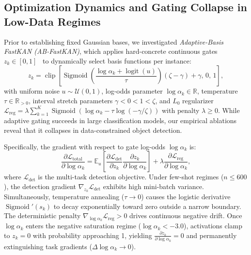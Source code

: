 \documentclass[conference]{IEEEtran}
\begin{document}
\subsection{Optimization Dynamics and Gating Collapse in Low-Data Regimes}
\label{sec:ablation}
Prior to establishing fixed Gaussian bases, we investigated \textit{Adaptive-Basis FastKAN (AB-FastKAN)}, which applies hard-concrete continuous gates $z_k \in [0, 1]$~\cite{louizos2018learning,maddison2017concrete} to dynamically select basis functions per instance:
\begin{equation}
  z_k = \operatorname{clip}\!\left[\operatorname{Sigmoid}\!\left(\frac{\log\alpha_k + \operatorname{logit}(u)}{\tau}\right)(\zeta - \gamma) + \gamma,\, 0,\, 1\right],
  \label{eq:concrete}
\end{equation}
with uniform noise $u \sim \mathcal{U}(0,1)$, log-odds parameter $\log \alpha_k \in \mathbb{R}$, temperature $\tau \in \mathbb{R}_{>0}$, interval stretch parameters $\gamma < 0 < 1 < \zeta$, and $L_0$ regularizer $\mathcal{L}_{\text{reg}} = \lambda \sum_{k=1}^K \operatorname{Sigmoid}(\log \alpha_k - \tau \log(-\gamma/\zeta))$ with penalty $\lambda \ge 0$. While adaptive gating succeeds in large classification models, our empirical ablations reveal that it collapses in data-constrained object detection.

Specifically, the gradient with respect to gate log-odds $\log \alpha_k$ is:
\begin{equation}
  \frac{\partial \mathcal{L}_{\text{total}}}{\partial \log \alpha_k} = \mathbb{E}_{u}\left[ \frac{\partial \mathcal{L}_{\text{det}}}{\partial z_k} \frac{\partial z_k}{\partial \log \alpha_k} \right] + \lambda \frac{\partial \mathcal{L}_{\text{reg}}}{\partial \log \alpha_k},
  \label{eq:gate_grad}
\end{equation}
where $\mathcal{L}_{\text{det}}$ is the multi-task detection objective. Under few-shot regimes ($n \le 600$), the detection gradient $\nabla_{z_k} \mathcal{L}_{\text{det}}$ exhibits high mini-batch variance. Simultaneously, temperature annealing ($\tau \to 0$) causes the logistic derivative $\operatorname{Sigmoid}'(s_k)$ to decay exponentially toward zero outside a narrow boundary. The deterministic penalty $\nabla_{\log \alpha_k} \mathcal{L}_{\text{reg}} > 0$ drives continuous negative drift. Once $\log \alpha_k$ enters the negative saturation regime ($\log \alpha_k < -3.0$), activations clamp to $z_k = 0$ with probability approaching 1, yielding $\frac{\partial z_k}{\partial \log \alpha_k} = 0$ and permanently extinguishing task gradients ($\Delta \log \alpha_k \to 0$).
\end{document}
